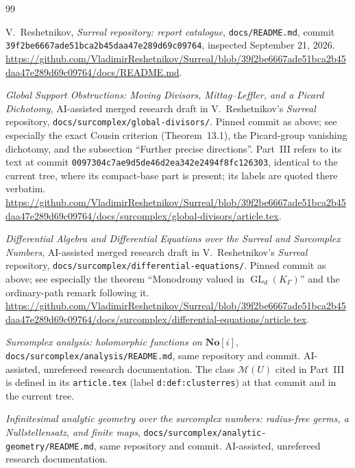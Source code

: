 \documentclass[11pt,letterpaper]{article}
\theoremstyle{definition}
\theoremstyle{remark}
\newcommand{\No}{\mathbf{No}}
\newcommand{\GL}{\operatorname{GL}}
\numberwithin{equation}{section}
\begin{document}
\begin{thebibliography}{99}
\small\raggedright
\setlength{\itemsep}{0.3em}

V.~Reshetnikov, \emph{Surreal repository: report catalogue},
\texttt{docs/README.md}, commit
\texttt{39f2be6667ade51bca2b45daa47e289d69c09764}, inspected September 21,
2026.
\url{https://github.com/VladimirReshetnikov/Surreal/blob/39f2be6667ade51bca2b45daa47e289d69c09764/docs/README.md}.

\emph{Global Support Obstructions: Moving Divisors, Mittag--Leffler, and a
Picard Dichotomy}, AI-assisted merged research draft in V.~Reshetnikov's
\emph{Surreal} repository, \texttt{docs/surcomplex/global-divisors/}. Pinned
commit as above; see especially the exact Cousin criterion (Theorem~13.1), the
Picard-group vanishing dichotomy, and the subsection ``Further precise
directions''. Part~III refers to its text at commit
\texttt{0097304c7ae9d5de46d2ea342e2494f8fc126303}, identical to the current
tree, where its compact-base part is present; its labels are quoted there
verbatim.
\url{https://github.com/VladimirReshetnikov/Surreal/blob/39f2be6667ade51bca2b45daa47e289d69c09764/docs/surcomplex/global-divisors/article.tex}.

\emph{Differential Algebra and Differential Equations over the Surreal and
Surcomplex Numbers}, AI-assisted merged research draft in V.~Reshetnikov's
\emph{Surreal} repository, \texttt{docs/surcomplex/differential-equations/}.
Pinned commit as above; see especially the theorem ``Monodromy valued in
$\GL_d(K_\Gamma)$'' and the ordinary-path remark following it.
\url{https://github.com/VladimirReshetnikov/Surreal/blob/39f2be6667ade51bca2b45daa47e289d69c09764/docs/surcomplex/differential-equations/article.tex}.

\emph{Surcomplex analysis: holomorphic functions on $\No[i]$},
\texttt{docs/surcomplex/analysis/README.md}, same repository and commit.
AI-assisted, unrefereed research documentation. The class $\mathcal M(U)$
cited in Part~III is defined in its \texttt{article.tex} (label
\texttt{d:def:clusterres}) at that commit and in the current tree.

\emph{Infinitesimal analytic geometry over the surcomplex numbers:
radius-free germs, a Nullstellensatz, and finite maps},
\texttt{docs/surcomplex/analytic-geometry/README.md}, same repository and
commit. AI-assisted, unrefereed research documentation.


\end{thebibliography}
\end{document}
